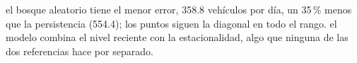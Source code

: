 {el bosque aleatorio tiene el menor error, 358.8 vehículos por día, un 35\,\% menos que la persistencia (554.4); los puntos siguen la diagonal en todo el rango.}
{el modelo combina el nivel reciente con la estacionalidad, algo que ninguna de las dos referencias hace por separado.}
